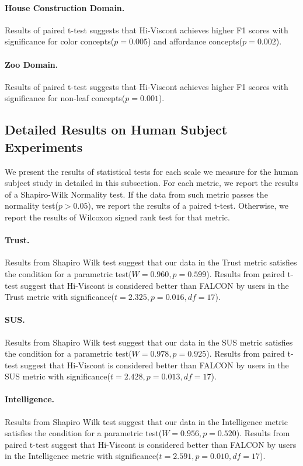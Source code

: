 \paragraph{House Construction Domain.} Results of paired t-test suggests that Hi-Viscont achieves higher F1 scores with significance for color concepts($p=0.005$) and affordance concepts($p=0.002$).
\paragraph{Zoo Domain.} Results of paired t-test suggests that Hi-Viscont achieves higher F1 scores with significance for non-leaf concepts($p=0.001$).




\subsection{Detailed Results on Human Subject Experiments}
We present the results of statistical tests for each scale we measure for the human subject study in detailed in this subsection. 
For each metric, we report the results of a Shapiro-Wilk Normality test. If the data from such metric passes the normality test($p>0.05$), we report the results of a paired t-test.
Otherwise, we report the results of Wilcoxon signed rank test for that metric. 
\paragraph{Trust.} Results from Shapiro Wilk test suggest that our data in the Trust metric satisfies the condition for a parametric test($W=0.960, p=0.599$). Results from paired t-test suggest that Hi-Viscont is considered better than FALCON by users in the Trust metric with significance($t=2.325, p=0.016, df=17$).
\paragraph{SUS.} Results from Shapiro Wilk test suggest that our data in the SUS metric satisfies the condition for a parametric test($W=0.978, p=0.925$). Results from paired t-test suggest that Hi-Viscont is considered better than FALCON by users in the SUS metric with significance($t=2.428, p=0.013, df=17$).
\paragraph{Intelligence.}Results from Shapiro Wilk test suggest that our data in the Intelligence metric satisfies the condition for a parametric test($W=0.956, p=0.520$). Results from paired t-test suggest that Hi-Viscont is considered better than FALCON by users in the Intelligence metric with significance($t=2.591, p=0.010, df=17$).
